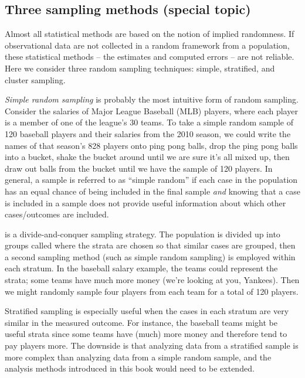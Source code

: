 \subsection{Three sampling methods (special topic)}
\label{threeSamplingMethods}

Almost all statistical methods are based on the notion of implied randomness. If observational data are not collected in a random framework from a population, these statistical methods -- the estimates and computed errors -- are not reliable. Here we consider three random sampling techniques: simple, stratified, and cluster sampling.

\emph{Simple random sampling} is probably the most intuitive form of random sampling. Consider the salaries of Major League Baseball (MLB) players, where each player is a member of one of the league's 30 teams. To take a simple random sample of 120 baseball players and their salaries from the 2010 season, we could write the names of that season's 828 players onto ping pong balls, drop the ping pong balls into a bucket, shake the bucket around until we are sure it's all mixed up, then draw out balls from the bucket until we have the sample of 120 players. In general, a sample is referred to as ``simple random'' if each case in the population has an equal chance of being included in the final sample \emph{and} knowing that a case is included in a sample does not provide useful information about which other cases/outcomes are included.

 is a divide-and-conquer sampling strategy. The population is divided up into groups called  where the strata are chosen so that similar cases are grouped, then a second sampling method (such as simple random sampling) is employed within each stratum. In the baseball salary example, the teams could represent the strata; some teams have much more money (we're looking at you, Yankees). Then we might randomly sample four players from each team for a total of 120 players.

Stratified sampling is especially useful when the cases in each stratum are very similar in the measured outcome. For instance, the baseball teams might be useful strata since some teams have (much) more money and therefore tend to pay players more. The downside is that analyzing data from a stratified sample is more complex than analyzing data from a simple random sample, and the analysis methods introduced in this book would need to be extended.

